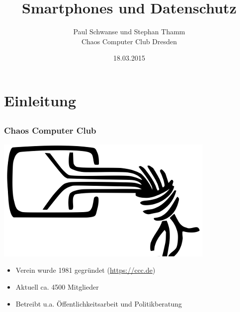 \documentclass[12pt]{beamer}
\title{Smartphones und Datenschutz}
\author{\small Paul Schwanse und Stephan Thamm\\\large Chaos Computer Club Dresden}
\date{18.03.2015}
\begin{document}
\maketitle
\tableofcontents[%
	currentsection,
	sectionstyle=show,
]

\section{Einleitung}
\subsection{}

\begin{frame}
    \frametitle{Chaos Computer Club}
    \begin{center}
	\includegraphics[height=0.2\textheight]{img/chaosknoten.png}
    \end{center}	
    \begin{itemize}
      \item<1-> Verein wurde 1981 gegründet (\url{https://ccc.de})          
      \item<2-> Aktuell ca. 4500 Mitglieder
      \item<3-> Betreibt u.a. Öffentlichkeitsarbeit und Politikberatung      
    \end{itemize}
\end{frame}
\end{document}
